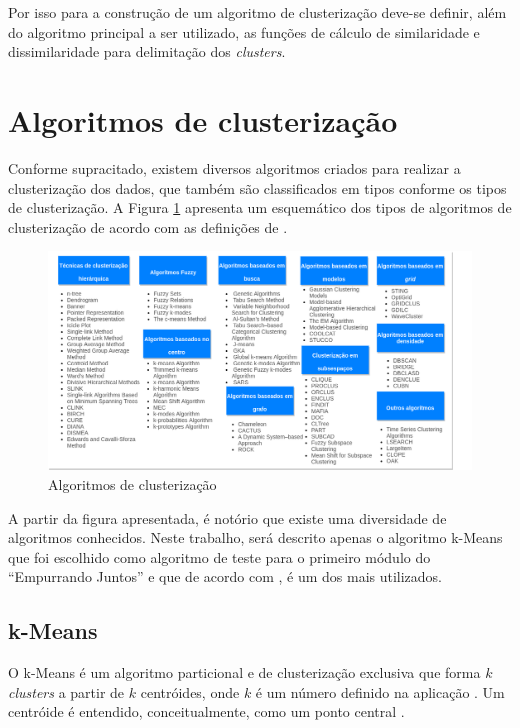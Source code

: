 Por isso para a construção de um algoritmo de clusterização deve-se definir, além do algoritmo principal a ser utilizado, as funções
de cálculo de similaridade e dissimilaridade para delimitação dos \textit{clusters}.

\section{Algoritmos de clusterização}
Conforme supracitado, existem diversos algoritmos criados para realizar a clusterização dos dados, que também são classificados em tipos
conforme os tipos de clusterização. A Figura \ref{fig:tipos_algoritmo} apresenta um esquemático dos tipos de algoritmos de clusterização de acordo
com as definições de .

\begin{figure}[h!]
\centering
\includegraphics[scale=0.5]{figuras/algoritmos.png}
\caption{Algoritmos de clusterização}
\label{fig:tipos_algoritmo}
\end{figure}

A partir da figura apresentada, é notório que existe uma diversidade de algoritmos conhecidos. Neste trabalho, será descrito
apenas o algoritmo k-Means que foi escolhido como algoritmo de teste para o primeiro módulo do ``Empurrando Juntos'' e que de 
acordo com , é um dos mais utilizados.

\subsection*{k-Means}
O k-Means é um algoritmo particional e de clusterização exclusiva que forma $k$ \textit{clusters} a partir de $k$ centróides, onde $k$ é um número definido na aplicação 
\cite{clustering_review, tan2013data}. Um centróide é entendido, conceitualmente, como um ponto central \cite{han2011data}.

